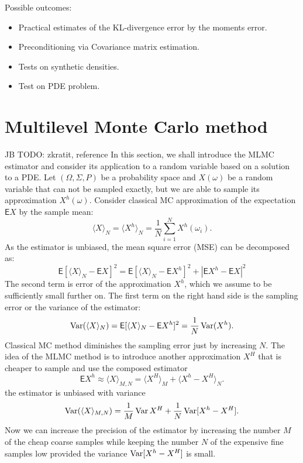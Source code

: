 \documentclass{article}
\def \E{{\mathsf E}}
\def\avg#1{\langle#1\rangle}
\def\Var{\mathop{\rm Var}}
\def\abs#1{|#1|}
\newcommand{\jb}[1]{{\color{violet}#1}}  %
\begin{document}
Possible outcomes:
\begin{itemize}
    \item Practical estimates of the KL-divergence error by the moments error.
    \item Preconditioning via Covariance matrix estimation.
    \item Tests on synthetic densities.
    \item Test on PDE problem.
\end{itemize}

\section{Multilevel Monte Carlo method}
\jb{JB TODO: zkratit, reference}
In this section, we shall introduce the MLMC estimator and consider its application to a random variable based on a solution to a PDE.
Let $(\Omega, \Sigma, P)$ be a probability space and $X(\omega)$ be a random variable
that can not be sampled exactly, but we are able to sample its approximation $X^h(\omega)$. 
Consider classical MC approximation of the expectation $\E X$ by the sample mean:
\[
    \avg{X}_N = \avg{X^h}_N = \frac{1}{N}\sum_{i=1}^{N} X^h(\omega_i).
\]
As the estimator is unbiased, the mean square error (MSE) can be decomposed as:
\begin{equation}
    \label{eq:mc_mse}
    \E[\avg{X}_N - \E X]^2 = \E[\avg{X}_N - \E X^h ]^2 + \abs{\E X^h - \E X}^2
\end{equation}
The second term is error of the approximation $X^h$, which we assume to be sufficiently small further on.
The first term on the right hand side is the sampling error or the variance of the estimator:
\[
    \Var(\avg{X}_N) = \E[\avg{X}_N - \E X^h ]^2 = \frac{1}{N}\Var(X^h).
\]
 Classical MC method diminishes the sampling error just by increasing $N$. The idea of the MLMC method is to introduce another approximation $X^H$ that is cheaper to sample and use the composed estimator
\[
	\E X^h \approx \avg{X}_{M,N} = \avg{X^H}_M	 + \avg{X^h - X^H}_N. 
\]
the estimator is unbiased with variance
\[
	\Var(\avg{X}_{M,N}) =  \frac{1}{M}\Var{X^H} + \frac{1}{N}\Var[X^h-X^H]. 
\]
Now we can increase the precision of the estimator by increasing the number $M$ of the cheap coarse samples while keeping the number $N$ of the expensive fine samples low provided the variance
$\Var[X^h-X^H]$ is small. 
\end{document}
